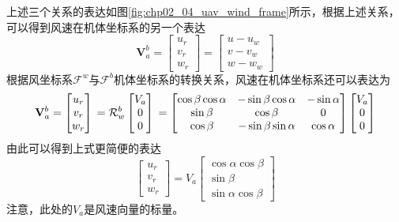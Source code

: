 上述三个关系的表达如图\ref{fig:chp02_04_uav_wind_frame}所示，根据上述关系，可以得到风速在机体坐标系的另一个表达
\begin{equation}
\mathbf{V}_a^b  = \begin{bmatrix} u_r \\ v_r \\ w_r \end{bmatrix} =   \begin{bmatrix} u - u_w \\ v - v_w \\ w- w_w \end{bmatrix}
\end{equation}
根据风坐标系$\mathcal{F}^w$与$\mathcal{F}^b$机体坐标系的转换关系，风速在机体坐标系还可以表达为
\begin{equation}
\mathbf{V}_a^b  = \begin{bmatrix} u_r \\ v_r \\ w_r \end{bmatrix} \\
=  \mathcal{R}_w^b \begin{bmatrix} V_a \\ 0 \\ 0 \end{bmatrix} \\
=  \begin{bmatrix}	\cos \beta \cos \alpha & - \sin \beta \cos \alpha  & - \sin \alpha      \\	 \sin \beta & \cos \beta   & 0 \\ 	\cos \beta   & -\sin \beta \sin \alpha & \cos \alpha \end{bmatrix} \begin{bmatrix} V_a \\ 0 \\ 0 \end{bmatrix}
\end{equation}
由此可以得到上式更简便的表达
\begin{equation}
\begin{bmatrix} u_r \\ v_r \\ w_r \end{bmatrix}  = {V}_a \begin{bmatrix} \cos \alpha \cos \beta \\ \sin \beta  \\ \sin \alpha \cos \beta \end{bmatrix}
\end{equation}
注意，此处的$V_a$是风速向量的标量。

